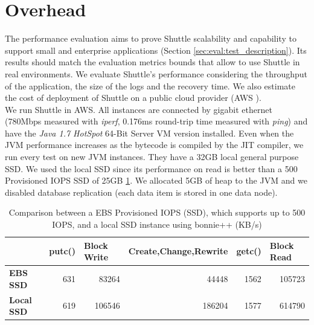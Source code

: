 \section{Overhead}\label{sec:eval:peformance}

The performance evaluation aims to prove Shuttle scalability and capability to support small and enterprise applications (Section \ref{sec:eval:test_description}). Its results should match the evaluation metrics bounds that allow to use Shuttle in real environments. We evaluate Shuttle's performance considering the throughput of the application, the size of the logs and the recovery time. We also estimate the cost of deployment of Shuttle on a public cloud provider (AWS \cite{aws}). \\

We run Shuttle in \ac{AWS}. All instances are connected by gigabit ethernet (780Mbps measured with \emph{iperf}, 0.176ms round-trip time measured with \emph{ping}) and have the \emph{Java 1.7 HotSpot} 64-Bit Server \ac{VM} version installed. Even when the \ac{JVM} performance increases as the bytecode is compiled by the \ac{JIT} compiler, we run every test on new \ac{JVM} instances. They have a 32GB local general purpose \ac{SSD}. We used the local \ac{SSD} since its performance on read is better than a 500 Provisioned \ac{IOPS} \ac{SSD} of 25GB \ref{tab:disk_throughput}. We allocated 5GB of heap to the \ac{JVM} and we disabled database replication (each data item is stored in one data node).

\begin{table}[ht]
\centering
\begin{tabular}{l|rrrrr}
                   & \multicolumn{1}{l}{\textbf{putc()}} & \multicolumn{1}{l}{\textbf{Block Write}} & \multicolumn{1}{l}{\textbf{Create,Change,Rewrite}} & \multicolumn{1}{l}{\textbf{getc()}} & \multicolumn{1}{l}{\textbf{Block Read}}  \\ \hline
\textbf{EBS SSD}      & 631                                 & 83264                                    & 44448                                              & 1562                                & 105723                                  \\
\textbf{Local SSD} & 619                                 & 106546                                   & 186204                                             & 1577                                & 614790                                 
\end{tabular}
\caption[Comparison between a EBS Provisioned IOPS (SSD) and local SSD instance]{Comparison between a EBS Provisioned IOPS (SSD), which supports up to 500 IOPS, and a local SSD instance using bonnie++ (KB/s)}
\label{tab:disk_throughput}
\end{table}




